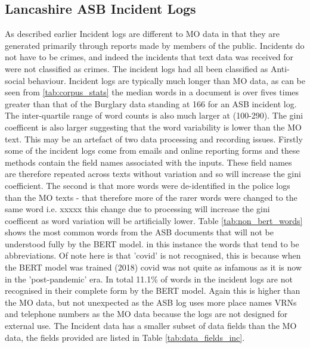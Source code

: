 \subsection{Lancashire ASB Incident Logs}As described earlier Incident logs are different to MO data in that they are generated primarily through reports made by members of the public. Incidents do not have to be crimes, and indeed the incidents that text data was received for were not classified as crimes. The incident logs had all been classified as Anti-social behaviour. Incident logs are typically much longer than MO data, as can be seen from \ref{tab:corpus_stats} the median words in a document is over fives times greater than that of the Burglary data standing at 166 for an ASB incident log. The inter-quartile range of word counts is also much larger at (100-290). The gini coefficent is also larger suggesting that the word variability is lower than the MO text. This may be an artefact of two data processing and recording issues. Firstly some of the incident logs come from emails and online reporting forms and these methods contain the field names associated with the inputs. These field names are therefore repeated across texts without variation and so will increase the gini coefficient. The second is that more words were de-identified in the police logs than the MO texts - that therefore more of the rarer words were changed to the same word i.e. xxxxx this change due to processing will increase the gini coefficent as word variation will be artificially lower. Table \ref{tab:non_bert_words} shows the most common words from the ASB documents that will not be understood fully by the BERT model. in this instance the words that  tend to be abbreviations. Of note here is that 'covid' is not recognised, this is because when the BERT model was trained (2018) covid was not quite as infamous as it is now in the 'post-pandemic' era. In total 11.1\% of words in the incident logs are not recognised in their complete form by the BERT model. Again this is higher than the MO data, but not unexpected as the ASB log uses more place names VRNs and telephone numbers as the MO data because the logs are not designed for external use. The Incident data has a smaller subset of data fields than the MO data, the fields provided are listed in Table \ref{tab:data_fields_inc}.

